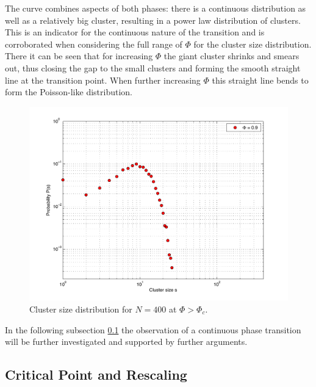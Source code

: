 \documentclass[11pt]{article}
\begin{document}
The curve combines aspects of both phases: there is a continuous distribution as well as a relatively big cluster, resulting in a power law distribution of clusters. This is an indicator for the continuous nature of the transition and is corroborated when considering the full range of $\Phi$ for the cluster size distribution. There it can be seen that for increasing $\Phi$ the giant cluster shrinks and smears out, thus closing the gap to the small clusters and forming the smooth straight line at the transition point. When further increasing $\Phi$ this straight line bends to form the Poisson-like distribution. \\

\begin{figure}[H]
  \centering
    \includegraphics[scale=0.7]{Plots/S_Pois.pdf}
  \caption{Cluster size distribution for $N=400$ at $\Phi>\Phi_c$.}
  \label{Fig:ClusterSizePois}
\end{figure}

In the following subsection \ref{Sec:Rescaling} the observation of a continuous phase transition will be further investigated and supported by further arguments. 
 

\subsection{Critical Point and Rescaling}
\label{Sec:Rescaling}
\end{document}
